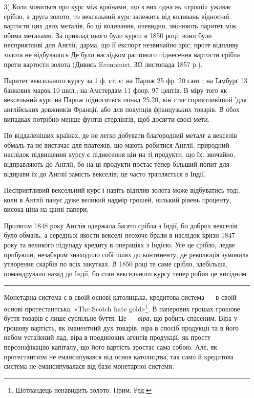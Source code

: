 
3) Коли мовиться про курс між країнами, що з них одна як «гроші»
уживає срібло, а друга золото, то вексельний курс залежить від коливань відносної
вартости цих двох металів, бо ці коливання, очевидно, змінюють паритет
між обома металами. За приклад цього були курси в 1850 році; вони були
несприятливі для Англії, дарма, що її експорт незвичайно зріс; проте відпливу
золота не відбувалось Де було наслідком раптового піднесення вартости срібла
проти вартости золота (Дивись Economist, ЗО листопада 1857 р.).

Паритет вексельного курсу за 1 ф. ст. є: на Париж 25 фр. 20 сант.; на
Ґамбурґ 13 банкових марок 10   шил.; на Амстердам 11 флор. 97 центів.
В міру того як вексельний курс на Париж підноситься понад 25.20, він стає
сприятливіший 'для англійських довжників Франції, або для покупців французьких
товарів. В обох випадках потрібно менше фунтів стерлінґів, щоб досягти
своєї мети.

По віддаленіших країнах, де не легко добувати благородний металг
а векселів обмаль та не вистачає для платежів, що мають робитися Англії,
природний наслідок підвищення курсу є піднесення цін на ті продукти, що їх.
звичайно, відправляють до Англії, бо на ці продукти постає тепер більший попит
для відправи їх до Англії замість векселів; це часто трапляється в Індії.

Несприятливий вексельний курс і навіть відплив золота може відбуватись
тоді, коли в Англії панує дуже великий надмір грошей, низький рівень проценту,
висока ціна на цінні папери.

Протягом 1848 року Англія одержала багато срібла з Індії, бо добрих
векселів було обмаль, а середньої якости векселі неохоче брали в наслідок
кризи 1847 року та великого підупаду кредиту в операціях з Індією. Усе це
срібло, ледве прибувши, незабаром знаходило собі шлях до континенту, де революція
зумовила утворення скарбів по всіх закутках. В 1850 році те саме
срібло, здебільша, помандрувало назад до Індії, бо стан вексельного курсу тепер
робив це вигідним.

\pfbreak

Монетарна система є в своїй основі католицька, кредитова система — в своїй
основі протестантська. «The Scotch hate gold»\footnote*{
Шотландець ненавидить золото. Прим. Ред.
}. В паперових грошах грошове
буття товарів є лише суспільне буття. Це — \emph{віра}, що робить спасеним. Віра
у грошову вартість, як іманентний дух товарів, віра в спосіб продукції та в його
небом усталений лад, віра в поодиноких агентів продукції, як просту персоніфікацію
капіталу, що його вартість зростає сама собою. Але, як протестантизм
не емансипувався від основ католицтва, так само й кредитова система не емансипувалася
від бази монетарної системи.

